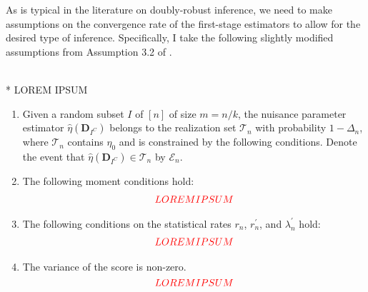 As is typical in the literature on doubly-robust inference, we need to make assumptions on the convergence rate of the first-stage estimators to allow for the desired type of inference.
Specifically, I take the following slightly modified assumptions from Assumption 3.2 of \citet{chernozhukov_doubledebiased_2018}.
\begin{boxD}
    \begin{asm}\label{asm:DDML_Rate_Cond}\mbox{}\\*
        {\color{red} LOREM IPSUM}
        \begin{enumerate}
            \item Given a random subset $I$ of $[n]$ of size $m = n/k$, the nuisance parameter estimator $\hat{\eta}\left(\mathbf{D}_{I^{C}}\right)$ belongs to the realization set $\mathcal{T}_n$ with probability $1 - \Delta_{n}$, where $\mathcal{T}_{n}$ contains $\eta_{0}$ and is constrained by the following conditions. 
            Denote the event that $\hat{\eta}\left(\mathbf{D}_{I^{C}}\right) \in \mathcal{T}_{n}$ by $\mathcal{E}_{n}$.
            \item The following moment conditions hold:
            \begin{align}
                {\color{red} LOREM IPSUM}
            \end{align}
            \item The following conditions on the statistical rates $r_{n}$, $r_{n}^{\prime}$, and $\lambda_{n}^{\prime}$ hold:
            \begin{align}
                {\color{red} LOREM IPSUM}
            \end{align}
            \item The variance of the score is non-zero.
            \begin{equation}
                {\color{red} LOREM IPSUM}
            \end{equation}
        \end{enumerate}
    \end{asm}    
\end{boxD}

